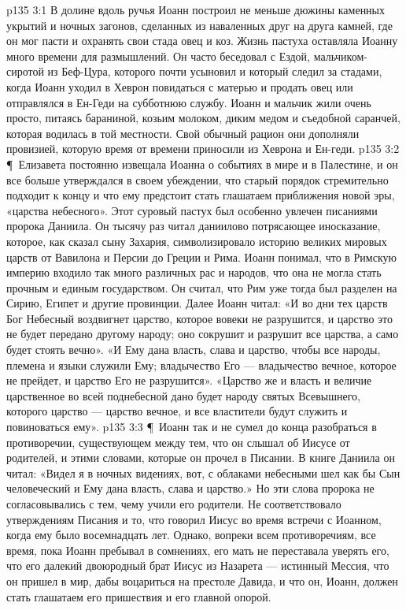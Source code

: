\vs p135 3:1 В долине вдоль ручья Иоанн построил не меньше дюжины каменных укрытий и ночных загонов, сделанных из наваленных друг на друга камней, где он мог пасти и охранять свои стада овец и коз. Жизнь пастуха оставляла Иоанну много времени для размышлений. Он часто беседовал с Ездой, мальчиком\hyp{}сиротой из Беф\hyp{}Цура, которого почти усыновил и который следил за стадами, когда Иоанн уходил в Хеврон повидаться с матерью и продать овец или отправлялся в Ен\hyp{}Геди на субботнюю службу. Иоанн и мальчик жили очень просто, питаясь бараниной, козьим молоком, диким медом и съедобной саранчей, которая водилась в той местности. Свой обычный рацион они дополняли провизией, которую время от времени приносили из Хеврона и Ен\hyp{}геди.
\vs p135 3:2 \P\ Елизавета постоянно извещала Иоанна о событиях в мире и в Палестине, и он все больше утверждался в своем убеждении, что старый порядок стремительно подходит к концу и что ему предстоит стать глашатаем приближения новой эры, «царства небесного». Этот суровый пастух был особенно увлечен писаниями пророка Даниила. Он тысячу раз читал даниилово потрясающее иносказание, которое, как сказал сыну Захария, символизировало историю великих мировых царств от Вавилона и Персии до Греции и Рима. Иоанн понимал, что в Римскую империю входило так много различных рас и народов, что она не могла стать прочным и единым государством. Он считал, что Рим уже тогда был разделен на Сирию, Египет и другие провинции. Далее Иоанн читал: «И во дни тех царств Бог Небесный воздвигнет царство, которое вовеки не разрушится, и царство это не будет передано другому народу; оно сокрушит и разрушит все царства, а само будет стоять вечно». «И Ему дана власть, слава и царство, чтобы все народы, племена и языки служили Ему; владычество Его --- владычество вечное, которое не прейдет, и царство Его не разрушится». «Царство же и власть и величие царственное во всей поднебесной дано будет народу святых Всевышнего, которого царство --- царство вечное, и все властители будут служить и повиноваться ему».
\vs p135 3:3 \P\ Иоанн так и не сумел до конца разобраться в противоречии, существующем между тем, что он слышал об Иисусе от родителей, и этими словами, которые он прочел в Писании. В книге Даниила он читал: «Видел я в ночных видениях, вот, с облаками небесными шел как бы Сын человеческий и Ему дана власть, слава и царство.» Но эти слова пророка не согласовывались с тем, чему учили его родители. Не соответствовало утверждениям Писания и то, что говорил Иисус во время встречи с Иоанном, когда ему было восемнадцать лет. Однако, вопреки всем противоречиям, все время, пока Иоанн пребывал в сомнениях, его мать не переставала уверять его, что его далекий двоюродный брат Иисус из Назарета --- истинный Мессия, что он пришел в мир, дабы воцариться на престоле Давида, и что он, Иоанн, должен стать глашатаем его пришествия и его главной опорой.
